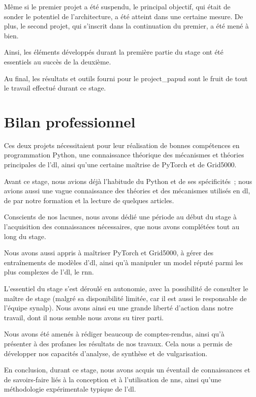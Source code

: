 Même si le premier projet a été suspendu, le principal objectif, qui était de sonder le potentiel de l'architecture, a été atteint dans une certaine mesure. De plus, le second projet, qui s'inscrit dans la continuation du premier, a été mené à bien.

Ainsi, les éléments développés durant la première partie du stage ont été essentiels au succès de la deuxième.

Au final, les résultats et outils fourni pour le \gls{project_papud} sont le fruit de tout le travail effectué durant ce stage.

\section{Bilan professionnel}
Ces deux projets nécessitaient pour leur réalisation de bonnes compétences en programmation Python, une connaissance théorique des mécanismes et théories principales de l'\gls{dl}, ainsi qu'une certaine maîtrise de PyTorch et de Grid5000.

Avant ce stage, nous avions déjà l'habitude du Python et de ses spécificités~; nous avions aussi une vague connaissance des théories et des mécanismes utilisés en \gls{dl}, de par notre formation et la lecture de quelques articles.

Conscients de nos lacunes, nous avons dédié une période au début du stage à l'acquisition des connaissances nécessaires, que nous avons complétées tout au long du stage.

Nous avons aussi appris à maîtriser PyTorch et Grid5000, à gérer des entraînements de modèles d'\gls{dl}, ainsi qu'à  manipuler un \gls{model} réputé parmi les plus complexes de l'\gls{dl}, le \gls{rnn}.


L'essentiel du stage s'est déroulé en autonomie, avec la possibilité de consulter le maître de stage (malgré sa disponibilité limitée, car il est aussi le responsable de l'équipe \gls{synalp}). Nous avons ainsi eu une grande liberté d'action dans notre travail, dont il nous semble nous avons su tirer parti.

Nous avons été amenés à rédiger beaucoup de comptes-rendus, ainsi qu'à présenter à des profanes les résultats de nos travaux. Cela nous a permis de développer nos capacités d'analyse, de synthèse et de vulgarisation.

En conclusion, durant ce stage, nous avons acquis un éventail de connaissances et de savoirs-faire liés à la conception et à l'utilisation de \glspl{nn}, ainsi qu'une méthodologie expérimentale typique de l'\gls{dl}.

